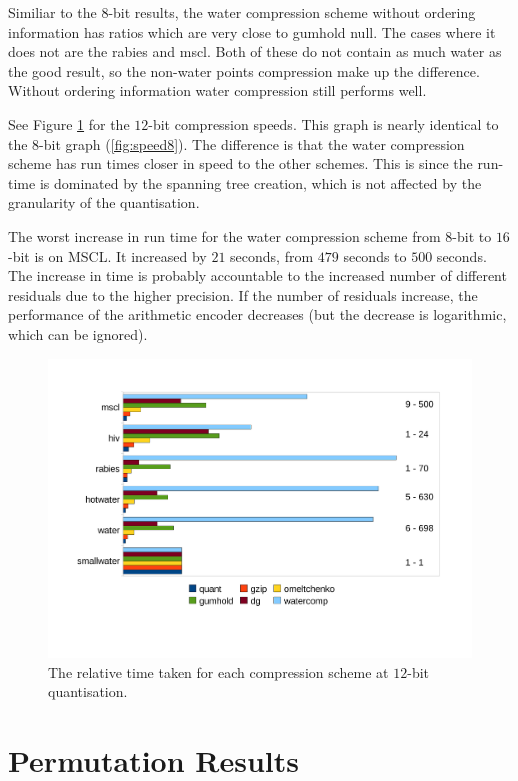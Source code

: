 \documentclass[a4paper]{report}
\begin{document}
Similiar to the $8$-bit results, the water compression scheme without ordering
information has ratios which are very close to gumhold null. The cases where
it does not are the rabies and mscl. Both of these do not contain as much
water as the good result, so the non-water points compression make up the
difference. Without ordering information water compression still performs
well.

See Figure \ref{fig:speed12} for the $12$-bit compression speeds. This graph
is nearly identical to the $8$-bit graph (\ref{fig:speed8}). The difference is
that the water compression scheme has run times closer in speed to the other
schemes. This is since the run-time is dominated by the spanning tree
creation, which is not affected by the granularity of the quantisation.

The worst increase in run time for the water compression scheme from $8$-bit
to $16$-bit is on MSCL. It increased by $21$ seconds, from $479$ seconds to
$500$ seconds. The increase in time is probably accountable to the increased
number of different residuals due to the higher precision. If the number of
residuals increase, the performance of the arithmetic encoder decreases (but
the decrease is logarithmic, which can be ignored).


\begin{figure}[h]
\centering
\includegraphics{images/speed12}
\caption{The relative time taken for each compression scheme at $12$-bit quantisation.}
\label{fig:speed12}
\end{figure}


\section{Permutation Results}
\end{document}
